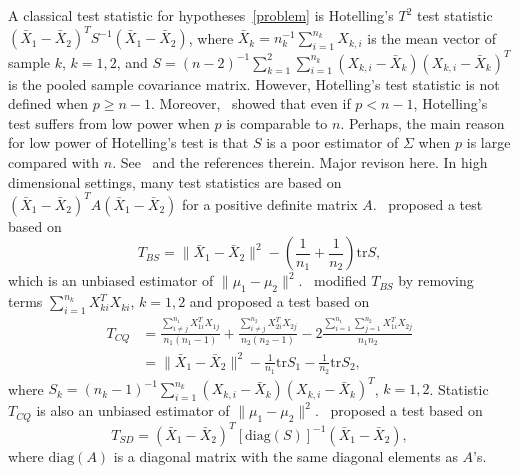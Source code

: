 \documentclass[review]{elsarticle}
\theoremstyle{plain}
\theoremstyle{definition}
\theoremstyle{remark}
\begin{document}
A classical test statistic for hypotheses~\eqref{problem} is Hotelling's $T^2$ test  statistic ${(\bar{X}_1-\bar{X}_2)}^T S^{-1}(\bar{X}_1-\bar{X}_2)$, where $\bar{X}_k=n_k^{-1}\sum_{i=1}^{n_k}X_{k,i}$ is the mean vector of sample $k$, $k=1,2$, and
    $
    S=
{(n-2)}^{-1}\sum_{k=1}^2\sum_{i=1}^{n_k} (X_{k,i}-\bar{X}_k) {(X_{k,i}-\bar{X}_k)}^T
    $
is the pooled sample covariance matrix.
However, Hotelling's test statistic is not defined when $p\geq n-1$.
Moreover,~\cite{Bai1996Efiect} showed that even if $p<n-1$, Hotelling's test suffers from low power when $p$ is comparable to $n$.
Perhaps, the main reason for low power of Hotelling's test is that $S$ is a poor estimator of $\Sigma$ when $p$ is large compared with $n$. See~\cite{Chen2010A} and the references therein.
{\color{red}Major revison here.}
In high dimensional settings,  
many test statistics are based on ${(\bar{X}_1-\bar{X}_2)}^T A(\bar{X}_1-\bar{X}_2)$ for a positive definite matrix $A$.~\cite{Bai1996Efiect} proposed a test based on
\begin{equation*}
    T_{BS}=\|\bar{X}_1-\bar{X}_2\|^2-(\frac{1}{n_1}+\frac{1}{n_2})\mathrm{tr}S,
\end{equation*}
which is an unbiased estimator of $\|\mu_1-\mu_2\|^2$.~\cite{Chen2010A} modified $T_{BS}$ by removing terms $\sum_{i=1}^{n_k}X_{ki}^T X_{ki}$, $k=1,2$ and proposed a test based on
\begin{equation*}
    \begin{aligned}
        T_{CQ}&=\frac{\sum_{i\neq j}^{n_1}X_{1i}^T X_{1j}}{n_1(n_1-1)}+\frac{\sum_{i\neq j}^{n_2}X_{2i}^T X_{2j}}{n_2(n_2-1)}-2\frac{\sum_{i=1}^{n_1}\sum_{j=1}^{n_2}X_{1i}^T X_{2j}}{n_1n_2}
        \\
            &=\|\bar{X}_1-\bar{X}_2\|^2-\frac{1}{n_1}\mathrm{tr}S_1-\frac{1}{n_2}\mathrm{tr}S_2,
    \end{aligned}
\end{equation*}
where
$S_k={(n_k -1)}^{-1}\sum_{i=1}^{n_k} (X_{k,i}-\bar{X}_k) {(X_{k,i}-\bar{X}_k)}^T
$, $k=1,2$.
 Statistic $T_{CQ}$ 
is also an unbiased estimator of $\|\mu_1-\mu_2\|^2$.~\cite{Srivastava2008A} proposed a test based on
\begin{equation*}
    T_{SD}={(\bar{X}_1-\bar{X}_2)}^T {[\mathrm{diag}(S)]}^{-1}(\bar{X}_1-\bar{X}_2),
\end{equation*}
where $\textrm{diag} (A)$ is a diagonal matrix with the same diagonal elements as $A$'s.
\end{document}
